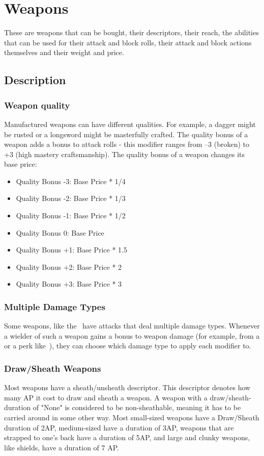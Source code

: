 \chapter{Weapons}\label{ch:weapons}
These are weapons that can be bought, their descriptors, their reach, the abilities that can be used for their attack and block rolls, their attack and block actions themselves and their weight and price.\\
\section{Description}\label{sec:weaponDescription}
\subsection{Weapon quality}\label{subsec:weaponQuality}
Manufactured weapons can have different qualities.
For example, a dagger might be rusted or a longsword might be masterfully crafted.
The quality bonus of a weapon adds a bonus to attack rolls - this modifier ranges from --3 (broken) to +3 (high mastery craftsmanship).
The quality bonus of a weapon changes its base price:\\

\begin{itemize}
    \item Quality Bonus -3: Base Price * 1/4
    \item Quality Bonus -2: Base Price * 1/3
    \item Quality Bonus -1: Base Price * 1/2
    \item Quality Bonus 0: Base Price
    \item Quality Bonus +1: Base Price * 1.5
    \item Quality Bonus +2: Base Price * 2
    \item Quality Bonus +3: Base Price * 3
\end{itemize}

\subsection{Multiple Damage Types}\label{subsec:multipleDamageTypeWeapons}
Some weapons, like the~ have attacks that deal multiple damage types.
Whenever a wielder of such a weapon gains a bonus to weapon damage (for example, from a or a perk like~), they can choose which damage type to apply each modifier to.

\subsection{Draw/Sheath Weapons}\label{subsec:sheathWeapons}
Most weapons have a sheath/unsheath descriptor.
This descriptor denotes how many AP it cost to draw and sheath a weapon.
A weapon with a draw/sheath-duration of "None" is considered to be non-sheathable, meaning it has to be carried around in some other way.
Most small-sized weapons have a Draw/Sheath duration of 2AP, medium-sized have a duration of 3AP, weapons that are strapped to one's back have a duration of 5AP, and large and clunky weapons, like shields, have a duration of 7 AP.

